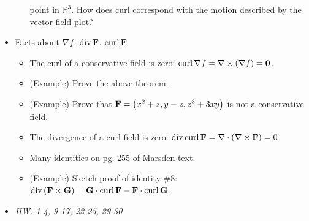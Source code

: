 \documentclass[11pt]{article}
\begin{document}
\begin{itemize}
\begin{itemize}
        point in \(\mathbb R^3\). How does curl correspond with the motion
        described by the vector field plot?
    \end{itemize}
  \item Facts about \(\nabla f\), \(\textrm{div}\, \mathbf{F}\), \(\textrm{curl}\, \mathbf{F}\)
    \begin{itemize}
      \item The curl of a conservative field is zero:
        \(\textrm{curl}\, \nabla f = \nabla \times (\nabla f) = \mathbf{0}\).
      \item (Example) Prove the above theorem.
      \item (Example) Prove that \(\mathbf{F}=\left(x^2+z,y-z,z^3+3xy\right)\) is not a
            conservative field.
      \item The divergence of a curl field is zero:
        \(\textrm{div}\, \textrm{curl}\, \mathbf{F} = \nabla\cdot(\nabla\times \mathbf{F})=0\)
      \item Many identities on pg. 255 of Marsden text.
      \item (Example) Sketch proof of identity \#8:
        \(\textrm{div}\,(\mathbf{F}\times\mathbf{G})=\mathbf{G}\cdot\textrm{curl}\,\mathbf{F}-\mathbf{F}\cdot\textrm{curl}\,\mathbf{G}\).
    \end{itemize}
  \item\textit{
    HW: 1-4, 9-17, 22-25, 29-30
  }
\end{itemize}
\end{document}
